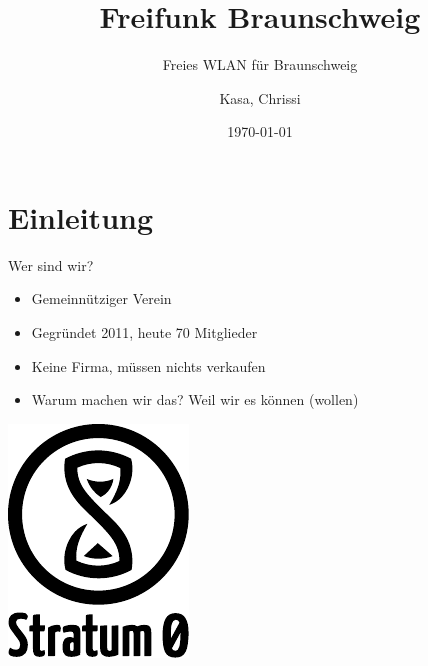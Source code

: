 \documentclass[fleqn,11pt,aspectratio=169]{beamer}
\title[Freifunk Braunschweig]{Freifunk Braunschweig}
\subtitle{Freies WLAN für Braunschweig}
\author[Kasa, Chrissi]{Kasa, Chrissi}
\date{\today}
\begin{document}
\begin{frame}[plain]
  \titlepage
\end{frame}


\section{Einleitung}

\begin{frame}{Wer sind wir?}
	\begin{multicols*}{2}
	\begin{block}{}
  \begin{itemize}
  	\item Gemeinnütziger Verein
		\item Gegründet 2011, heute 70 Mitglieder
		\item Keine Firma, müssen nichts verkaufen
		\item Warum machen wir das? Weil wir es können (wollen)
	\end{itemize}
	\end{block}
	\centering
	\includegraphics{stratum0.pdf}
\end{multicols*}
\end{frame}
\end{document}
